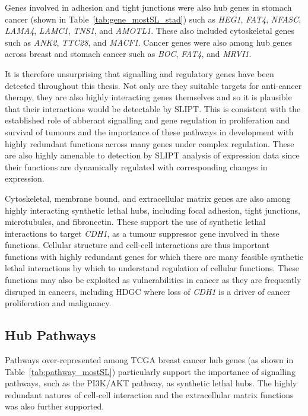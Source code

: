 Genes involved in adhesion and tight junctions were also hub genes in stomach cancer (shown in Table~\ref{tab:gene_mostSL_stad}) such as \textit{HEG1}, \textit{FAT4}, \textit{NFASC}, \textit{LAMA4}, \textit{LAMC1}, \textit{TNS1}, and \textit{AMOTL1}. These also included cytoskeletal genes such as \textit{ANK2}, \textit{TTC28}, and \textit{MACF1}. Cancer genes were also among hub genes across breast and stomach cancer such as \textit{BOC}, \textit{FAT4}, and \textit{MRVI1}. 

It is therefore unsurprising that signalling and regulatory genes have been detected throughout this thesis. Not only are they suitable targets for anti-cancer therapy, they are also highly interacting genes themselves and so it is plausible that their interactions would be detectable by SLIPT. This is consistent with the established role of abberant signalling and gene regulation in proliferation and survival of tumours and the importance of these pathways in development with highly redundant functions across many genes under complex regulation. These are also highly amenable to detection by SLIPT analysis of expression data since their functions are dynamically regulated with corresponding changes in expression.

Cytoskeletal, membrane bound, and extracellular matrix genes are also among highly interacting synthetic lethal hubs, including focal adhesion, tight junctions, microtubules, and fibronectin. These support the use of synthetic lethal interactions to target \textit{CDH1}, as a tumour suppressor gene involved in these functions. Cellular structure and cell-cell interactions are thus important functions with highly redundant genes for which there are many feasible synthetic lethal interactions by which to understand regulation of cellular functions. These functions may also be exploited as vulnerabilities in cancer as they are frequently disruped in cancers, including HDGC where loss of \textit{CDH1} is a driver of cancer proliferation and malignancy.  


\FloatBarrier

\subsection{Hub Pathways}

Pathways over-represented among TCGA breast cancer hub genes (as shown in Table~\ref{tab:pathway_mostSL}) particularly support the importance of signalling pathways, such as the PI3K/AKT pathway, as synthetic lethal hubs. The highly redundant natures of cell-cell interaction and the extracellular matrix functions was also further supported.


